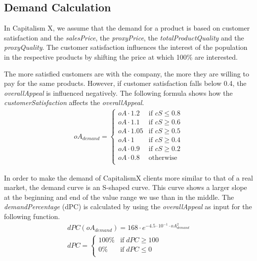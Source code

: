 \subsection{Demand Calculation} \label{demandCalc}

In Capitalism X, we assume that the demand for a product is based on customer satisfaction and the \textit{salesPrice}, the \textit{proxyPrice}, the \textit{totalProductQuality} and the \textit{proxyQuality}. 
The customer satisfaction influences the interest of the population in the respective products by shifting the price at which 100\% are interested.
 
The more satisfied customers are with the company, the more they are willing to pay for the same products. However, if customer satisfaction falls below 0.4, the \textit{overallAppeal} is influenced negatively. The following formula shows how the \textit{customerSatisfaction} affects the \textit{overallAppeal}.
\begin{equation}
\label{func:demandPrice}
\begin{aligned}
 oA_{demand} = 
\begin{cases}
    oA \cdot 1.2 & \text{if } cS \leq 0.8 \\
    oA \cdot 1.1 & \text{if } cS \geq 0.6 \\
    oA \cdot 1.05 & \text{if } cS \geq 0.5 \\
    oA \cdot 1 & \text{if } cS \geq 0.4 \\
    oA \cdot 0.9 & \text{if } cS \geq 0.2 \\
    oA \cdot 0.8 & \text{otherwise} \\
\end{cases}
\end{aligned}
\end{equation}

In order to make the demand of CapitalismX clients more similar to that of a real market, the demand curve is an S-shaped curve. This curve shows a larger slope at the beginning and end of the value range we use than in the middle.
\newline
The \textit{demandPercentage} (\gls{dPC}) is calculated by using the \textit{overallAppeal} as input for the following function. 
\begin{equation}
\label{func:demandPercentage}
\begin{aligned}
dPC(oA_{demand}) = 168 \cdot e^{−4.5 \cdot 10^{ -1 } \cdot oA_{demand}^{ 2 } } \\
dPC = 
    \begin{cases}
        100\% & \text{if} \; dPC \geq 100\\
        0\% & \text{if} \; dPC \leq 0\\
    \end{cases}
\end{aligned}
\end{equation}

